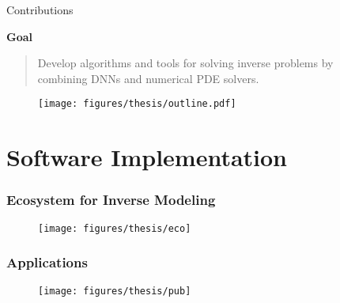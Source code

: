 \documentclass[usenames,dvipsnames]{beamer}
\begin{document}
\begin{frame}{Contributions}
	
	\textbf{Goal}
	
	\vspace{0.2cm}
	
	\begin{quote}
	Develop algorithms and tools for solving inverse problems by \\ combining DNNs and numerical PDE solvers. 
	\end{quote}

	
	\begin{figure}[hbt]
	\centering
	\texttt{[image: figures/thesis/outline.pdf]}
\end{figure}
\end{frame}



\section{Software Implementation}
\begin{frame}
	\frametitle{Ecosystem for Inverse Modeling}
	
	
	\begin{figure}[hbt]
		\centering
		\texttt{[image: figures/thesis/eco]}
	\end{figure}
\end{frame}

\begin{frame}
	\frametitle{Applications}
	
	
	\begin{figure}[hbt]
		\centering
		\texttt{[image: figures/thesis/pub]}
	\end{figure}
\end{frame}
\end{document}
